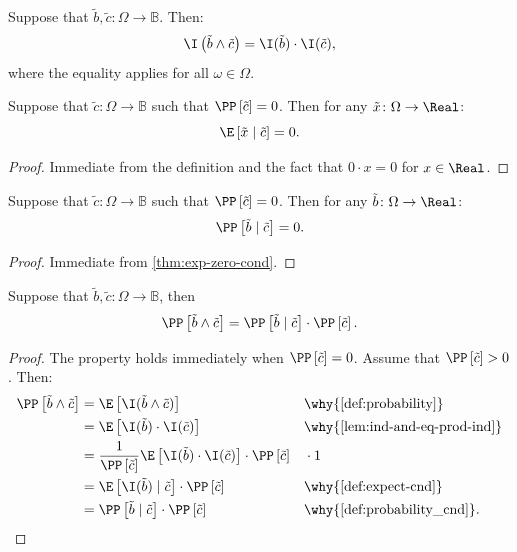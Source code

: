 \begin{lemma} \label{lem:ind-and-eq-prod-ind}
Suppose that $\tilde{b}, \tilde{c} \colon \Omega \to \mathbb{B}$. Then:
\[
\I \left( \tilde{b} \wedge \tilde{c} \right) = \I ( \tilde{b} ) \cdot  \I ( \tilde{c} ),  
\]
where the equality applies for all $\omega \in \Omega$.
\end{lemma}

\begin{theorem} \label{thm:exp-zero-cond}
Suppose that $\tilde{c} \colon \Omega \to \mathbb{B}$ such that $\PP\left[ \tilde{c} \right] = 0$. Then for any $\tilde{x} \colon \Omega \to \Real$:
\[
\E \left[ \tilde{x} \mid \tilde{c} \right] = 0.
\]
\end{theorem}
\begin{proof}
Immediate from the definition and the fact that $0 \cdot  x = 0$ for $x\in \Real$.
\end{proof}

\begin{theorem} \label{thm:prob-zero-cond}
Suppose that $\tilde{c} \colon \Omega \to \mathbb{B}$ such that $\PP\left[ \tilde{c} \right] = 0$. Then for any $\tilde{b} \colon \Omega \to \Real$:
\[
\PP\left[ \tilde{b} \mid \tilde{c} \right] = 0.
\]
\end{theorem}
\begin{proof}
Immediate from \cref{thm:exp-zero-cond}.
\end{proof}

\begin{theorem} \label{thm:prob-eq-prob-cond-prob}
Suppose that $\tilde{b}, \tilde{c} \colon \Omega \to \mathbb{B}$, then
\[
\PP \left[ \tilde{b} \wedge \tilde{c} \right] 
=
\PP \left[ \tilde{b} \mid \tilde{c} \right] \cdot \PP \left[ \tilde{c} \right].
\]
\end{theorem}
\begin{proof} The property holds immediately when $\PP \left[ \tilde{c} \right] = 0$. Assume that $\PP \left[ \tilde{c} \right] > 0$. Then:
  \begin{align*}
    \PP \left[ \tilde{b} \wedge \tilde{c} \right]
    &= \E \left[ \I(\tilde{b} \wedge \tilde{c}) \right] && \why{\cref{def:probability}} \\
    &= \E \left[ \I(\tilde{b}) \cdot \I(\tilde{c}) \right] && \why{\cref{lem:ind-and-eq-prod-ind}}\\
    &= \frac{1}{\PP \left[ \tilde{c} \right]}\E \left[ \I(\tilde{b}) \cdot \I(\tilde{c}) \right] \cdot \PP \left[ \tilde{c} \right] && \cdot 1 \\
    &= \E \left[ \I(\tilde{b}) \mid \tilde{c} \right] \cdot \PP \left[ \tilde{c} \right]
    && \why{\cref{def:expect-cnd}} \\
    &= \PP \left[ \tilde{b} \mid \tilde{c} \right] \cdot \PP \left[ \tilde{c} \right] && \why{\cref{def:probability_cnd}}.
  \end{align*}
\end{proof}

